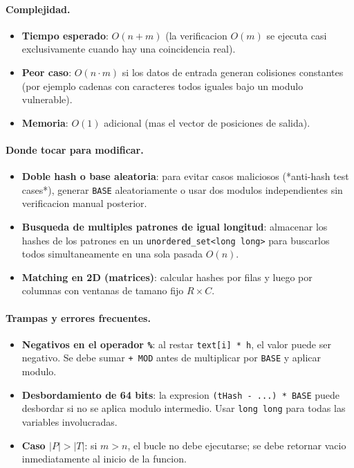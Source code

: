 \paragraph{Complejidad.}
\begin{itemize}\setlength\itemsep{0pt}
	\item \textbf{Tiempo esperado}: $O(n + m)$ (la verificacion $O(m)$ se ejecuta casi exclusivamente cuando hay una coincidencia real).
	\item \textbf{Peor caso}: $O(n \cdot m)$ si los datos de entrada generan colisiones constantes (por ejemplo cadenas con caracteres todos iguales bajo un modulo vulnerable).
	\item \textbf{Memoria}: $O(1)$ adicional (mas el vector de posiciones de salida).
\end{itemize}

\paragraph{Donde tocar para modificar.}
\begin{itemize}\setlength\itemsep{0pt}
	\item \textbf{Doble hash o base aleatoria}: para evitar casos maliciosos (*anti-hash test cases*), generar \verb|BASE| aleatoriamente o usar dos modulos independientes sin verificacion manual posterior.
	\item \textbf{Busqueda de multiples patrones de igual longitud}: almacenar los hashes de los patrones en un \verb|unordered_set<long long>| para buscarlos todos simultaneamente en una sola pasada $O(n)$.
	\item \textbf{Matching en 2D (matrices)}: calcular hashes por filas y luego por columnas con ventanas de tamano fijo $R \times C$.
\end{itemize}

\paragraph{Trampas y errores frecuentes.}
\begin{itemize}\setlength\itemsep{0pt}
	\item \textbf{Negativos en el operador \texttt{\%}}: al restar \verb|text[i] * h|, el valor puede ser negativo. Se debe sumar \verb|+ MOD| antes de multiplicar por \verb|BASE| y aplicar modulo.
	\item \textbf{Desbordamiento de 64 bits}: la expresion \verb|(tHash - ...) * BASE| puede desbordar si no se aplica modulo intermedio. Usar \verb|long long| para todas las variables involucradas.
	\item \textbf{Caso $|P| > |T|$}: si $m > n$, el bucle no debe ejecutarse; se debe retornar vacio inmediatamente al inicio de la funcion.
\end{itemize}

